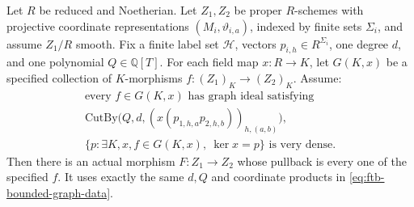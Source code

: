 \begin{srproposition}
\label{prop:ftb-morphism-from-bounded-graphs}
Let \(R\) be reduced and Noetherian.
Let \(Z_1,Z_2\) be proper \(R\)-schemes with projective
coordinate representations
\((M_i,\vartheta_{i,a})\), indexed by finite sets
\(\Sigma_i\), and assume \(Z_1/R\) smooth.
Fix a finite label set \(\mathcal H\), vectors
\(p_{i,h}\in R^{\Sigma_i}\), one degree \(d\), and one
polynomial \(Q\in\mathbb Q[T]\).
For each field map \(x:R\to K\), let \(G(K,x)\) be a
specified collection of \(K\)-morphisms
\(f:(Z_1)_K\to(Z_2)_K\).
Assume:
\[
 \begin{gathered}
 \text{every }f\in G(K,x)\text{ has graph ideal satisfying}\\
 \mathrm{CutBy}\bigl(Q,d,
        (x(p_{1,h,a}p_{2,h,b}))_{h,(a,b)}\bigr),\\
 \{p:\exists K,x,f\in G(K,x),\ \ker x=p\}
                   \text{ is very dense}.
 \end{gathered}
 \tag{G1}\label{eq:ftb-bounded-graph-data}
\]
Then there is an actual morphism \(F:Z_1\to Z_2\)
whose pullback is every one of the specified \(f\).
It uses exactly the same \(d,Q\) and coordinate products
in \eqref{eq:ftb-bounded-graph-data}.
\end{srproposition}
